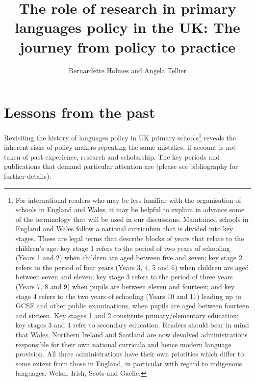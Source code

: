 \documentclass[output=paper]{langscibook}
\author{Bernardette Holmes\orcid{}\affiliation{Co-chair of the Research in Primary Languages Network} and Angela Tellier\orcid{}\affiliation{University of Essex}}
\title[The role of research in primary languages policy in the UK]
      {The role of research in primary languages policy in the UK: The journey from policy to practice}
\begin{document}
\maketitle 

\section{Lessons from the past}

Revisiting the history of languages policy in UK primary schools\footnote{\textrm{For international readers who may be less familiar with the organisation of schools in England and Wales, it may be helpful to explain in advance some of the terminology that will be used in our discussions. Maintained schools in England and Wales follow a national curriculum that is divided into key stages. These are legal terms that describe blocks of years that relate to the children’s age: key stage 1 refers to the period of two years of schooling (Years 1 and 2) when children are aged between five and seven; key stage 2 refers to the period of four years (Years 3, 4, 5 and 6) when children are aged between seven and eleven; key stage 3 refers to the period of three years (Years 7, 8 and 9) when pupils are between eleven and fourteen; and key stage 4 refers to the two years of schooling (Years 10 and 11) leading up to GCSE and other public examinations, when pupils are aged between fourteen and sixteen. Key stages 1 and 2 constitute primary/elementary education; key stages 3 and 4 refer to secondary education. Readers should bear in mind that Wales, Northern Ireland and Scotland are now devolved administrations responsible for their own national curricula and hence modern language provision. All three administrations have their own priorities which differ to some extent from those in England, in particular with regard to indigenous languages, Welsh, Irish, Scots and Gaelic.} } reveals the inherent risks of policy makers repeating the same mistakes, if account is not taken of past experience, research and scholarship. The key periods and publications that demand particular attention are (please see bibliography for further details):
\end{document}
